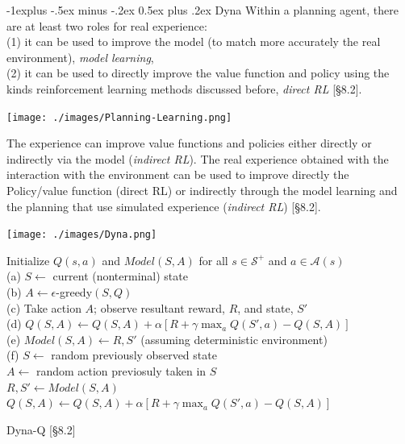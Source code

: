 \documentclass[10pt,landscape]{article}
\makeatletter
\renewcommand{\subsection}{\@startsection{subsection}{2}{0mm}%
                                {-1explus -.5ex minus -.2ex}%
                                {0.5ex plus .2ex}%
                                {\normalfont\normalsize\bfseries}}
\makeatother
\begin{document}
\begin{multicols}{3}
\subsection{Dyna}
Within a planning agent, there are at least two roles for real experience: \\
(1) it can be used to improve the model (to match more accurately the real environment), \emph{model learning},\\ 
(2) it can be used to directly improve the value function and policy using the kinds reinforcement learning methods discussed before, \emph{direct RL} [§8.2].\\
\begin{center}
\texttt{[image: ./images/Planning-Learning.png]}
\end{center}
The experience can improve value functions and policies either directly or indirectly via the model (\emph{indirect RL}).
The real experience obtained with the interaction with the environment can be used to improve directly the Policy/value function (direct RL) or indirectly through the model learning and the planning that use simulated experience (\emph{indirect RL}) [§8.2].\\
\begin{center}
\texttt{[image: ./images/Dyna.png]}
\end{center}

\begin{algorithm}[H]
 Initialize $Q(s,a)$ and $Model(S,A)$ for all $s \in \mathcal{S}^+$ and $a \in \mathcal{A}(s)$\\
{
	(a) $S \leftarrow$ current (nonterminal) state \\
	(b) $A \leftarrow \epsilon$-greedy$(S, Q)$ \\
	(c) Take action $A$; observe resultant reward, $R$, and state, $S'$ \\
	(d) $Q(S, A) \leftarrow Q(S, A) + \alpha \left[R + \gamma \max_a Q(S', a) - Q(S, A)  \right]$ \\
	(e) $Model(S, A) \leftarrow R, S'$ (assuming deterministic environment) \\
	(f) 
	{
		$S \leftarrow$ random previously observed state \\
		$A \leftarrow$ random action previosuly taken in $S$\\
		$R, S' \leftarrow Model(S, A)$ \\
		$Q(S, A) \leftarrow Q(S, A) + \alpha \left[R + \gamma \max_a Q(S', a) - Q(S, A)  \right]$ \\
	}
 }
\caption{Dyna-Q [§8.2]}
\end{algorithm}


\end{multicols}
\end{document}
